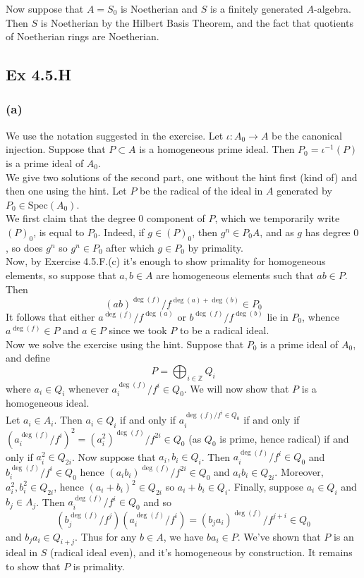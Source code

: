 \documentclass{article}
\theoremstyle{definition}
\newcommand{\Z}{\mathbb{Z}}
\newcommand{\Spec}{\text{Spec}}
\begin{document}
Now suppose that $A = S_0$ is Noetherian and $S$ is a finitely generated
$A$-algebra. Then $S$ is Noetherian by the Hilbert Basis Theorem, and the fact
that quotients of Noetherian rings are Noetherian.

\subsection*{Ex 4.5.H}
\subsubsection*{(a)}

We use the notation suggested in the exercise. Let $\iota : A_0 \to A$ be the
canonical injection. Suppose that $P \subset A$ is a homogeneous prime ideal.
Then $P_0 = \iota^{-1}(P)$ is a prime ideal of $A_0$. \\

We give two solutions of the second part, one without the hint first (kind of)
and then one using the hint. Let $P$ be the radical of the ideal in $A$
generated by $P_0 \in \Spec(A_0)$. \\

We first claim that the degree $0$ component of $P$, which we temporarily write
$(P)_{0}$, is equal to $P_{0}$. Indeed, if $g \in (P)_{0}$, then $g^{n} \in
	P_{0}A$, and as $g$ has degree $0$, so does $g^{n}$ so $g^{n} \in P_{0}$ after
which $g \in P_{0}$ by primality. \\

Now, by Exercise 4.5.F.(c) it's enough to show
primality for homogeneous elements, so suppose that $a, b \in A$ are
homogeneous elements such that $ab \in P$. Then
\[
	(ab)^{\deg(f)}/f^{\deg(a) + \deg(b)} \in P_{0}
\]
It follows that either $a^{\deg(f)}/f^{\deg(a)}$ or $b^{\deg(f)}/f^{\deg(b)}$
lie in $P_{0}$, whence $a^{\deg(f)} \in P$ and $a \in P$ since we took $P$ to
be a radical ideal. \\

Now we solve the exercise using the hint. Suppose that $P_0$ is a prime ideal
of $A_0$, and define
\[
	P = \bigoplus_{i \in \Z} Q_i
\]
where $a_i \in Q_i$ whenever $a_i^{\deg(f)}/f^i \in Q_0$. We will now
show that $P$ is a homogeneous ideal. \\

Let $a_i \in A_i$. Then $a_i \in Q_i$ if and only if $a_i^{\deg(f)/f^i \in
	Q_0}$ if and only if $(a_i^{\deg(f)}/f^i)^2 = (a_i^{2})^{\deg(f)}/f^{2i} \in
	Q_0$ (as $Q_0$ is prime, hence radical) if and only if $a_i^{2} \in Q_{2i}$.
Now suppose that $a_i, b_i \in Q_i$. Then $a_i^{\deg(f)}/f^{i} \in Q_0$ and
$b_i^{\deg(f)}/f^{i} \in Q_0$ hence $(a_ib_i)^{\deg(f)}/f^{2i} \in Q_0$ and
$a_ib_i \in Q_{2i}$. Moreover, $a_i^{2}, b_i^{2} \in Q_{2i}$, hence $(a_i +
	b_i)^{2} \in Q_{2i}$ so $a_i + b_i \in Q_i$. Finally, suppose $a_i \in Q_i$ and
$b_j \in A_j$. Then $a_i^{\deg(f)}/f^i \in Q_0$ and so
\[
	\left(b_j^{\deg(f)}/f^j\right)
	\left(a_i^{\deg(f)}/f^i\right)
	=
	(b_j a_i)^{\deg(f)}/f^{j + i}
	\in Q_0
\]
and $b_ja_i \in Q_{i + j}$. Thus for any $b \in A$, we have $ba_i \in P$. We've
shown that $P$ is an ideal in $S$ (radical ideal even), and it's homogeneous by
construction. It remains to show that $P$ is primality. \\
\end{document}
